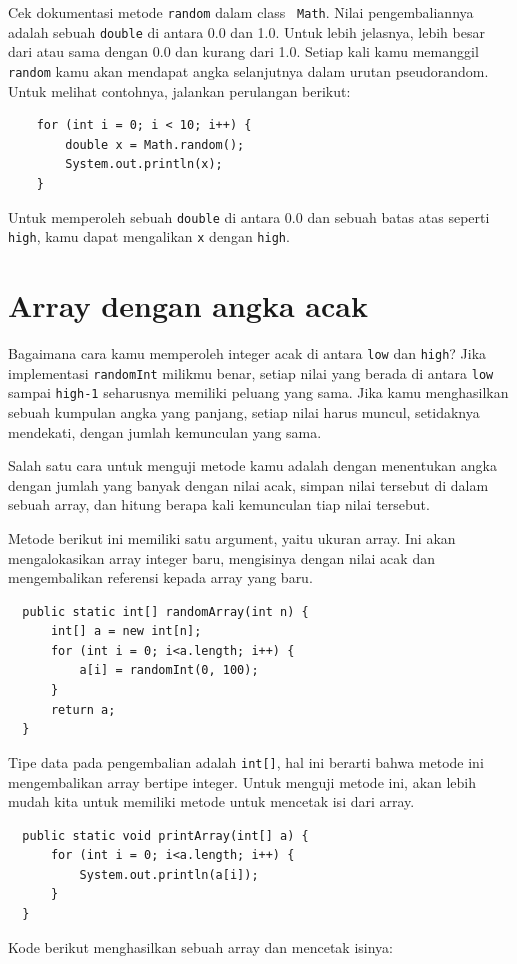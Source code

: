 Cek dokumentasi metode {\tt random} dalam class {\tt
Math}.  Nilai pengembaliannya adalah sebuah {\tt double} di antara 0.0 dan 1.0.
Untuk lebih jelasnya, lebih besar dari atau sama dengan 0.0 dan kurang dari 1.0.  Setiap kali kamu memanggil {\tt random} kamu akan mendapat angka selanjutnya dalam urutan pseudorandom.
Untuk melihat contohnya, jalankan perulangan berikut:

\begin{lstlisting}
    for (int i = 0; i < 10; i++) {
        double x = Math.random();
        System.out.println(x);
    }
\end{lstlisting}
%
Untuk memperoleh sebuah {\tt double} di antara 0.0 dan sebuah batas atas seperti
{\tt high}, kamu dapat mengalikan {\tt x} dengan {\tt high}.


\section{Array dengan angka acak}
\label{randarray}

Bagaimana cara kamu memperoleh integer acak di antara {\tt low} dan {\tt high}?
Jika implementasi {\tt randomInt} milikmu benar, setiap nilai yang berada di antara {\tt low} sampai {\tt high-1} seharusnya
memiliki peluang yang sama.  Jika kamu menghasilkan sebuah kumpulan angka yang panjang, setiap nilai harus muncul, setidaknya mendekati, dengan jumlah kemunculan yang sama.

Salah satu cara untuk menguji metode kamu adalah dengan menentukan angka dengan jumlah yang banyak dengan nilai acak, simpan nilai tersebut di dalam sebuah array, dan hitung berapa kali kemunculan tiap nilai tersebut.

Metode berikut ini memiliki satu argument, yaitu ukuran array. Ini akan mengalokasikan array integer baru, mengisinya dengan nilai acak dan mengembalikan referensi kepada array yang baru.

\begin{lstlisting}
  public static int[] randomArray(int n) {
      int[] a = new int[n];
      for (int i = 0; i<a.length; i++) {
          a[i] = randomInt(0, 100);
      }
      return a;
  }
\end{lstlisting}
%
Tipe data pada pengembalian adalah {\tt int[]}, hal ini berarti bahwa metode ini mengembalikan array bertipe integer.
Untuk menguji metode ini, akan lebih mudah kita untuk memiliki metode untuk mencetak isi dari array.

\begin{lstlisting}
  public static void printArray(int[] a) {
      for (int i = 0; i<a.length; i++) {
          System.out.println(a[i]);
      }
  }
\end{lstlisting}
%
Kode berikut menghasilkan sebuah array dan mencetak isinya:

